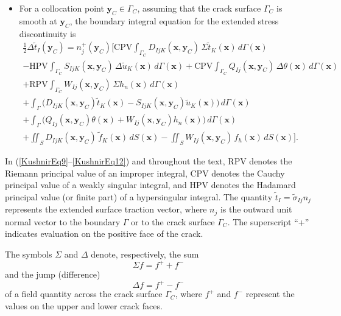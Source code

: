 \begin{itemize}
	\item For a collocation point $\mathbf{y}_C\in\Gamma_C$, assuming that
	the crack surface $\Gamma_C$ is smooth at $\mathbf{y}_C$, the boundary
	integral equation for the extended stress discontinuity is
	\begin{multline}
		\frac{1}{2}\Delta\tilde{t}_I(\mathbf{y}_C)
		=
		n_j^{+}(\mathbf{y}_C)
		\bigg[
		\mathrm{CPV}\!\int_{\Gamma_C}
		D_{IjK}(\mathbf{x},\mathbf{y}_C)
		\,\Sigma\tilde{t}_K(\mathbf{x})\,d\Gamma(\mathbf{x})
		\\
		-
		\mathrm{HPV}\!\int_{\Gamma_C}
		S_{IjK}(\mathbf{x},\mathbf{y}_C)
		\,\Delta\tilde{u}_K(\mathbf{x})\,d\Gamma(\mathbf{x})
		+
		\mathrm{CPV}\!\int_{\Gamma_C}
		Q_{Ij}(\mathbf{x},\mathbf{y}_C)
		\,\Delta\theta(\mathbf{x})\,d\Gamma(\mathbf{x})
		\\
		+
		\mathrm{RPV}\!\int_{\Gamma_C}
		W_{Ij}(\mathbf{x},\mathbf{y}_C)
		\,\Sigma h_n(\mathbf{x})\,d\Gamma(\mathbf{x})
		\\
		+
		\int_{\Gamma}
		\big(
		D_{IjK}(\mathbf{x},\mathbf{y}_C)\tilde{t}_K(\mathbf{x})
		-
		S_{IjK}(\mathbf{x},\mathbf{y}_C)\tilde{u}_K(\mathbf{x})
		\big)
		\,d\Gamma(\mathbf{x})
		\\
		+
		\int_{\Gamma}
		\big(
		Q_{Ij}(\mathbf{x},\mathbf{y}_C)\theta(\mathbf{x})
		+
		W_{Ij}(\mathbf{x},\mathbf{y}_C)h_n(\mathbf{x})
		\big)
		\,d\Gamma(\mathbf{x})
		\\
		+
		\iint_{S}
		D_{IjK}(\mathbf{x},\mathbf{y}_C)
		\,\tilde{f}_K(\mathbf{x})\,dS(\mathbf{x})
		-
		\iint_{S}
		W_{Ij}(\mathbf{x},\mathbf{y}_C)
		\,f_h(\mathbf{x})\,dS(\mathbf{x})
		\bigg].
		\label{KushnirEq10}
	\end{multline}
\end{itemize}

	In (\ref{KushnirEq9}–\ref{KushnirEq12}) and throughout the text, RPV denotes the Riemann
	principal value of an improper integral, CPV denotes the Cauchy
	principal value of a weakly singular integral, and HPV denotes the
	Hadamard principal value (or finite part) of a hypersingular integral. The quantity
	$\tilde{t}_{I}=\tilde{\sigma}_{Ij}n_{j}$
	represents the extended surface traction vector, where $n_{j}$ is
	the outward unit normal vector to the boundary $\Gamma$ or to the
	crack surface $\Gamma_{C}$. The superscript ``+'' indicates evaluation
	on the positive face of the crack.
	
	The symbols $\Sigma$ and $\Delta$ denote, respectively, the sum
	\[
	\Sigma f = f^{+}+f^{-}
	\]
	and the jump (difference)
	\[
	\Delta f = f^{+}-f^{-}
	\]
	of a field quantity across the crack surface $\Gamma_{C}$, where
	$f^{+}$ and $f^{-}$ represent the values on the upper and lower crack
	faces.
	

